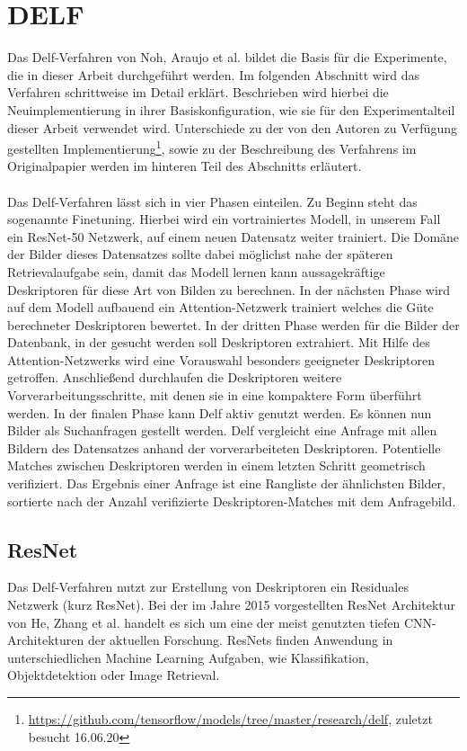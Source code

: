 \chapter{DELF}\label{delf_chapter}
Das Delf-Verfahren \cite{delf} von Noh, \mbox{Araujo} et al. bildet die Basis für die Experimente, die in dieser Arbeit durchgeführt werden. Im folgenden Abschnitt wird das Verfahren schrittweise im Detail erklärt. Beschrieben wird hierbei die Neuimplementierung in ihrer Basiskonfiguration, wie sie für den Experimentalteil dieser Arbeit verwendet wird. Unterschiede zu der von den Autoren zu Verfügung gestellten Implementierung\footnote[1]{\url{https://github.com/tensorflow/models/tree/master/research/delf}, zuletzt besucht 16.06.20}, sowie zu der Beschreibung des Verfahrens im Originalpapier \cite{delf} werden im hinteren Teil des Abschnitts erläutert. 
\\\\
Das Delf-Verfahren lässt sich in vier Phasen einteilen. Zu Beginn steht das sogenannte Finetuning. Hierbei wird ein vortrainiertes Modell, in unserem Fall ein ResNet-50 Netzwerk, auf einem neuen Datensatz weiter trainiert. Die Domäne der Bilder dieses Datensatzes sollte dabei möglichst nahe der späteren Retrievalaufgabe sein, damit das Modell lernen kann aussagekräftige Deskriptoren für diese Art von Bilden zu berechnen. In der nächsten Phase wird auf dem Modell aufbauend ein Attention-Netzwerk trainiert welches die Güte berechneter Deskriptoren bewertet. In der dritten Phase werden für die Bilder der Datenbank, in der gesucht werden soll Deskriptoren extrahiert. Mit Hilfe des Attention-Netzwerks wird eine Vorauswahl besonders geeigneter Deskriptoren getroffen. Anschließend durchlaufen die Deskriptoren weitere Vorverarbeitungsschritte, mit denen sie in eine kompaktere Form überführt werden. In der finalen Phase kann Delf aktiv genutzt werden. Es können nun Bilder als Suchanfragen gestellt werden. Delf vergleicht eine Anfrage mit allen Bildern des Datensatzes anhand der vorverarbeiteten Deskriptoren. Potentielle Matches zwischen Deskriptoren werden in einem letzten Schritt geometrisch verifiziert. Das Ergebnis einer Anfrage ist eine Rangliste der ähnlichsten Bilder, sortierte nach der Anzahl verifizierte Deskriptoren-Matches mit dem Anfragebild.

\section{ResNet}

Das Delf-Verfahren nutzt zur Erstellung von Deskriptoren ein Residuales Netzwerk (kurz ResNet). Bei der im Jahre 2015 vorgestellten ResNet Architektur \cite{resnet} von He, Zhang et al. handelt es sich um eine der meist genutzten tiefen CNN-Architekturen der aktuellen Forschung. ResNets finden Anwendung in unterschiedlichen Machine Learning Aufgaben, wie Klassifikation, Objektdetektion oder Image Retrieval. \\

